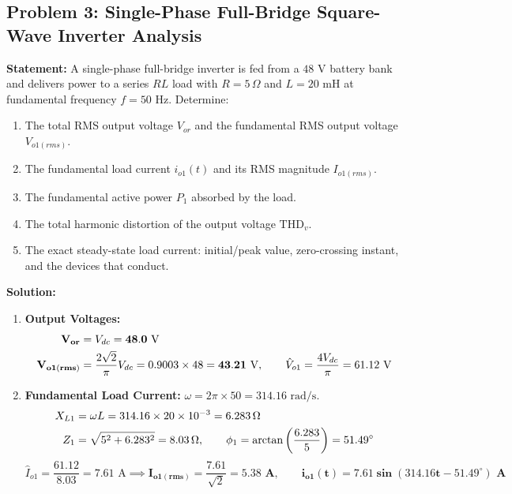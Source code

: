 \documentclass[11pt,a4paper]{article}
\let\origsubsection\subsection
\renewcommand{\subsection}{\Needspace{7\baselineskip}\origsubsection}
\begin{document}
\subsection{Problem 3: Single-Phase Full-Bridge Square-Wave Inverter Analysis}
\begin{examplebox}
\textbf{Statement:} A single-phase full-bridge inverter is fed from a $48\text{ V}$ battery bank and delivers power to a series $RL$ load with $R = 5\,\Omega$ and $L = 20\text{ mH}$ at fundamental frequency $f = 50\text{ Hz}$. Determine:
\begin{enumerate}
  \item The total RMS output voltage $V_{or}$ and the fundamental RMS output voltage $V_{o1(rms)}$.
  \item The fundamental load current $i_{o1}(t)$ and its RMS magnitude $I_{o1(rms)}$.
  \item The fundamental active power $P_1$ absorbed by the load.
  \item The total harmonic distortion of the output voltage $\text{THD}_v$.
  \item The exact steady-state load current: initial/peak value, zero-crossing instant, and the devices that conduct.
\end{enumerate}

\tcblower
\textbf{Solution:}
\begin{enumerate}
  \item \textbf{Output Voltages:}
  \begin{align*}
  \mathbf{V_{or}} &= V_{dc} = \mathbf{48.0\text{ V}} \notag\\
  \mathbf{V_{o1(rms)}} &= \frac{2\sqrt{2}}{\pi} V_{dc} = 0.9003 \times 48 = \mathbf{43.21\text{ V}}, \qquad \hat{V}_{o1} = \frac{4V_{dc}}{\pi} = 61.12\text{ V}
  \end{align*}

  \item \textbf{Fundamental Load Current:} $\omega = 2\pi \times 50 = 314.16\text{ rad/s}$.
  \begin{align*}
  X_{L1} &= \omega L = 314.16 \times 20 \times 10^{-3} = 6.283\,\Omega \notag\\
  Z_1 &= \sqrt{5^2 + 6.283^2} = 8.03\,\Omega, \qquad \phi_1 = \arctan\left(\frac{6.283}{5}\right) = 51.49^\circ
  \end{align*}
  \begin{equation*}
  \hat{I}_{o1} = \frac{61.12}{8.03} = 7.61\text{ A} \implies \mathbf{I_{o1(rms)}} = \frac{7.61}{\sqrt{2}} = \mathbf{5.38\text{ A}}, \qquad \mathbf{i_{o1}(t) = 7.61 \sin(314.16 t - 51.49^\circ)\text{ A}}
  \end{equation*}


\end{enumerate}
\end{examplebox}
\end{document}
